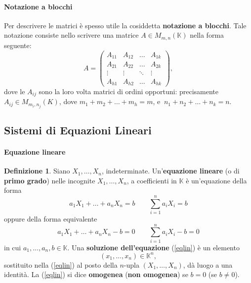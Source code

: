 \documentclass{article}
\theoremstyle{plain}
\theoremstyle{definition}
\newtheorem{defn}{Definizione}[section]
\theoremstyle{remark}
\begin{document}
\vspace{10pt}

\paragraph{Notazione a blocchi}
Per descrivere le matrici è spesso utile la cosiddetta \textbf{notazione a blocchi}. 
Tale notazione consiste nello scrivere una matrice \( A \in M_{m,n}(\mathbb{K}) \) nella forma seguente:
\[
A = \begin{pmatrix}
A_{11} & A_{12} & \ldots & A_{1k} \\
A_{21} & A_{22} & \ldots & A_{2k} \\
\vdots & \vdots & \ddots & \vdots \\
A_{h1} & A_{h2} & \ldots & A_{hk}
\end{pmatrix},
\]
dove le \( A_{ij} \) sono la loro volta matrici di ordini opportuni: precisamente \( A_{ij} \in M_{m_i,n_j}(K) \), dove \( m_1 + m_2 + \ldots + m_h = m \), e  \(\  n_1 + n_2 + \ldots + n_k = n \).\\

\newpage
\subsection{Sistemi di Equazioni Lineari}
\vspace{20pt}


\paragraph{Equazione lineare}
\begin{bxthm}
\begin{defn}
    Siano \( X_1, \ldots, X_n \), indeterminate. 
Un'\textbf{equazione lineare} (o di \textbf{primo grado}) nelle incognite \( X_1, \ldots, X_n \), a coefficienti in \( \mathbb{K} \) è un'equazione della forma
\begin{equation}
    a_1X_1 + \ldots + a_nX_n = b \quad\quad\sum_{i=1}^{n}a_iX_i=b\label{eqlin}
\end{equation}
oppure della forma equivalente
\[
    a_1X_1 + \ldots + a_nX_n - b = 0\quad\quad\sum_{i=1}^{n}a_iX_i-b=0
\]
in cui \( a_1, \ldots, a_n, b \in \mathbb{K} \). 
Una \textbf{soluzione dell'equazione} (\ref{eqlin}) è un elemento \[(x_1, \ldots, x_n) \in \mathbb{K}^n,\]  sostituito nella (\ref{eqlin}) al posto della \( n \)-upla \( (X_1, \ldots, X_n) \), dà luogo a una identità.
La (\ref{eqlin}) si dice \textbf{omogenea} (\textbf{non omogenea}) se \( b = 0 \) (se \( b \neq 0 \)).
\end{defn}
\end{bxthm}
\end{document}
